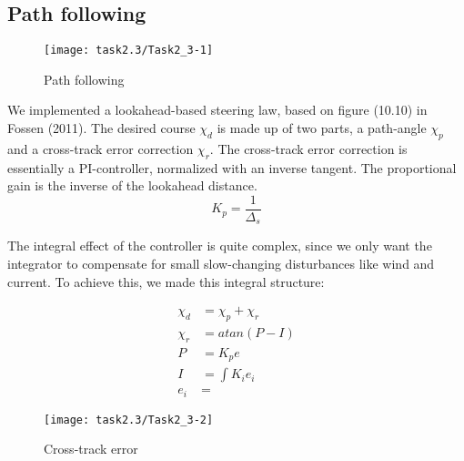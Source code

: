 \subsection{Path following}\label{sec:prob2.2}
\begin{wrapfigure}{r}{0.5 \textwidth}
    \begin{center}
    \texttt{[image: task2.3/Task2\_3-1]}
    \caption{Path following}
    \end{center}
    \label{fig:2.3-path}
\end{wrapfigure}

We implemented a lookahead-based steering law, based on figure (10.10) in Fossen (2011). The desired course $\chi_d$ is made up of two parts, a path-angle $\chi_p$ and a cross-track error correction $\chi_r$. The cross-track error correction is essentially a PI-controller, normalized with an inverse tangent. The proportional gain is the inverse of the lookahead distance.
\begin{equation}
	K_p = \frac{1}{\Delta_s}
\end{equation}

The integral effect of the controller is quite complex, since we only want the integrator to compensate for small slow-changing disturbances like wind and current. To achieve this, we made this integral structure:

\begin{equation}
\begin{split}
	\chi_d &= \chi_p + \chi_r \\
	\chi_r &= atan(P - I) \\
	P &= K_p e \\
	I &= \int K_i e_i \\
	e_i &=
\end{split}
\end{equation}


\begin{figure}[b]
    \centering
    \texttt{[image: task2.3/Task2\_3-2]}
    \caption{Cross-track error}
    \label{fig:2.3-error}
\end{figure}